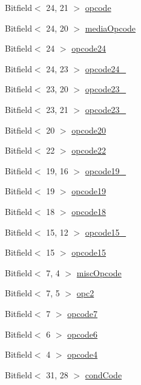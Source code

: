 \begin{DoxyCompactItemize}
\item 
Bitfield$<$ 24, 21 $>$ \hyperlink{namespaceArmISA_ac06b6f5e23886a3ea05be7d7a6556039}{opcode}
\item 
Bitfield$<$ 24, 20 $>$ \hyperlink{namespaceArmISA_a72592444ea3003e9aab09fc2fc421eb4}{mediaOpcode}
\item 
Bitfield$<$ 24 $>$ \hyperlink{namespaceArmISA_af661b480f8ce5b779c29bd3090fcbfc7}{opcode24}
\item 
Bitfield$<$ 24, 23 $>$ \hyperlink{namespaceArmISA_aa88a97a11e7e2049b9b5739847cafee9}{opcode24\_}
\item 
Bitfield$<$ 23, 20 $>$ \hyperlink{namespaceArmISA_a4557ad2805535f7ebfec8a2f986514aa}{opcode23\_}
\item 
Bitfield$<$ 23, 21 $>$ \hyperlink{namespaceArmISA_a37672d7b2ca0cd9d34c2a16b6be3a637}{opcode23\_}
\item 
Bitfield$<$ 20 $>$ \hyperlink{namespaceArmISA_a1edf5364d92c33810c1e14569f3fb1d7}{opcode20}
\item 
Bitfield$<$ 22 $>$ \hyperlink{namespaceArmISA_a2bb6de1c02ac50c0dfa556ac025acff4}{opcode22}
\item 
Bitfield$<$ 19, 16 $>$ \hyperlink{namespaceArmISA_af9f3336a58484c83cb98c1cd69fe59ac}{opcode19\_}
\item 
Bitfield$<$ 19 $>$ \hyperlink{namespaceArmISA_ac292848ff3908b2d1ab6928fe58a0fc0}{opcode19}
\item 
Bitfield$<$ 18 $>$ \hyperlink{namespaceArmISA_aa2618ac30c49df460282574ae2996b8e}{opcode18}
\item 
Bitfield$<$ 15, 12 $>$ \hyperlink{namespaceArmISA_ac3ebe07ddb7dd9553b1c9accb9330645}{opcode15\_}
\item 
Bitfield$<$ 15 $>$ \hyperlink{namespaceArmISA_a8668f4ff9615522eb8efa1772ae52dea}{opcode15}
\item 
Bitfield$<$ 7, 4 $>$ \hyperlink{namespaceArmISA_a4a3807d9963d947f8f54e4832ad36c16}{miscOpcode}
\item 
Bitfield$<$ 7, 5 $>$ \hyperlink{namespaceArmISA_a157f37a4869ffa3f5bbfef48efe5cded}{opc2}
\item 
Bitfield$<$ 7 $>$ \hyperlink{namespaceArmISA_ac591f72a9e9afba6eff9018ada8fb070}{opcode7}
\item 
Bitfield$<$ 6 $>$ \hyperlink{namespaceArmISA_af8631c0d2832da1e6827a385ef997126}{opcode6}
\item 
Bitfield$<$ 4 $>$ \hyperlink{namespaceArmISA_a87cafcbb81e0444e88a615b421baec44}{opcode4}
\item 
Bitfield$<$ 31, 28 $>$ \hyperlink{namespaceArmISA_ab7a67909d1ff5e05bf773c739ccb1032}{condCode}

\end{DoxyCompactItemize}
